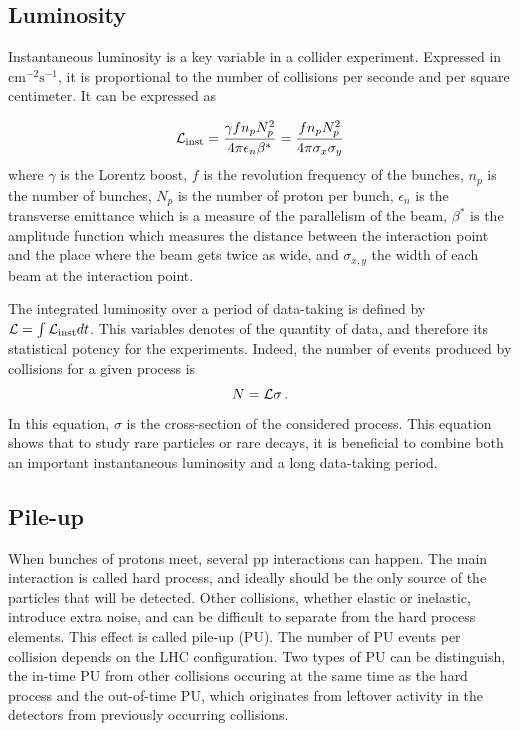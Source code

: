 \subsection{Luminosity}

Instantaneous luminosity is a key variable in a collider experiment. Expressed in $\mathrm{cm^{-2} s^{-1}}$, it is proportional to the number of collisions per seconde and per square centimeter. It can be expressed as

\begin{equation}
    \mathcal{L}_{\rm{inst}} = \frac{\gamma f n_p N_p^2}{4\pi \epsilon_n \beta^{*}} = \frac{f n_p N_p^2}{4\pi \sigma_x \sigma_y}
\end{equation}
where $\gamma$ is the Lorentz boost, $f$ is the revolution frequency of the bunches, $n_p$ is the number of bunches, $N_p$ is the number of proton per bunch, $\epsilon_n$ is the transverse emittance which is a measure of the parallelism of the beam, $\beta^*$ is the amplitude function which measures the distance between the interaction point and the place where the beam gets twice as wide, and $\sigma_{x,y}$ the width of each beam at the interaction point.

The integrated luminosity over a period of data-taking is defined by $\mathcal{L} = \int \mathcal{L}_{\rm{inst}} dt$. This variables denotes of the quantity of data, and therefore its statistical potency for the experiments. Indeed, the number of events produced by collisions for a given process is 
\begin{equation}
    N = \Lagr \sigma \mend
\end{equation}
In this equation, $\sigma$ is the cross-section of the considered process. This equation shows that to study rare particles or rare decays, it is beneficial to combine both an important instantaneous luminosity and a long data-taking period.

\subsection{Pile-up}

When bunches of protons meet, several pp interactions can happen. The main interaction is called hard process, and ideally should be the only source of the particles that will be detected. Other collisions, whether elastic or inelastic, introduce extra noise, and can be difficult to separate from the hard process elements. This effect is called pile-up (PU). The number of PU events per collision depends on the LHC configuration. Two types of PU can be distinguish, the in-time PU from other collisions occuring at the same time as the hard process and the out-of-time PU, which originates from leftover activity in the detectors from previously occurring collisions.

